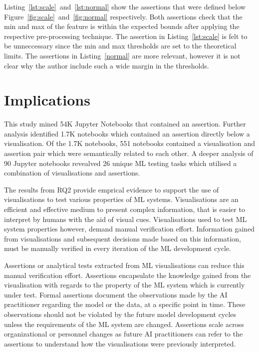 \documentclass[conference]{IEEEtran}
\begin{document}
Listing~\ref{lst:scale}~and~\ref{lst:normal} show the assertions that were defined below Figure~\ref{fig:scale}~and~\ref{fig:normal} respectively. Both assertions check that the min and max of the feature is within the expected bounds after applying the respective pre-processing technique. The assertion in Listing~\ref{lst:scale} is felt to be unneccessary since the min and max thresholds are set to the theoretical limits. The assertions in Listing~\ref{normal} are more relevant, however it is not clear why the author include such a wide margin in the thresholds.

\section{Implications}\label{sec:discuss}

This study mined 54K Jupyter Notebooks that contained an assertion. Further analysis identified 1.7K notebooks which contained an assertion directly below a visualisation. Of the 1.7K notebooks, 551 notebooks contained a visualisation and assertion pair which were semantically related to each other. A deeper analysis of 90 Jupyter notebooks revealved 26 unique ML testing tasks which utilised a combination of visualisations and assertions.

The results from RQ2 provide emprical evidence to support the use of visualisations to test various properties of ML systems.  Visualisations are an efficient and effective medium to present complex information, that is easier to interpret by humans with the aid of visual cues. Visualisations used to test ML system properties however, demand manual verification effort. Information gained from visualisations and subsequent decisions made based on this information, must be manually verified in every iteration of the ML development cycle.


Assertions or analytical tests extracted from ML visualisations can reduce this manual verification effort. Assertions encapsulate the knowledge gained from the visualisation with regards to the property of the ML system which is currently under test. Formal assertions document the observations made by the AI practitioner regarding the model or the data, at a specific point in time. These observations should not be violated by the future model development cycles unless the requirements of the ML system are changed. Assertions scale across organizational or personnel changes as future AI practitioners can refer to the assertions to understand how the visualisations were previously interpreted.
\end{document}
